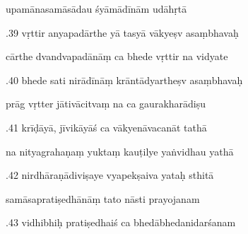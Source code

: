 \documentclass[article,12pt,a4paper]{memoir}%
\newcounter{parCount}
\begin{document}
	  
	  \pstart \leavevmode%
	upamānasamāsādau śyāmādīnām udāhṛtā 
	{}
	\pend%
      

	  
	  \pstart {}.39 vṛttir anyapadārthe yā tasyā vākyeṣv asaṃbhavaḥ 
	{}
	\pend%
      

	  
	  \pstart \leavevmode%
	cārthe dvandvapadānāṃ ca bhede vṛttir na vidyate 
	{}
	\pend%
      

	  
	  \pstart {}.40 bhede sati nirādīnāṃ krāntādyartheṣv asaṃbhavaḥ 
	{}
	\pend%
      

	  
	  \pstart \leavevmode%
	prāg vṛtter jātivācitvaṃ na ca gaurakharādiṣu 
	{}
	\pend%
      

	  
	  \pstart {}.41 krīḍāyā, jīvikāyāś ca vākyenāvacanāt tathā 
	{}
	\pend%
      

	  
	  \pstart \leavevmode%
	na nityagrahaṇaṃ yuktaṃ kauṭilye yaṅvidhau yathā 
	{}
	\pend%
      

	  
	  \pstart {}.42 nirdhāraṇādiviṣaye vyapekṣaiva yataḥ sthitā 
	{}
	\pend%
      

	  
	  \pstart \leavevmode%
	samāsapratiṣedhānāṃ tato nāsti prayojanam 
	{}
	\pend%
      

	  
	  \pstart {}.43 vidhibhiḥ pratiṣedhaiś ca   bhedābhedanidarśanam 
	{}
	\pend%
      
\end{document}
